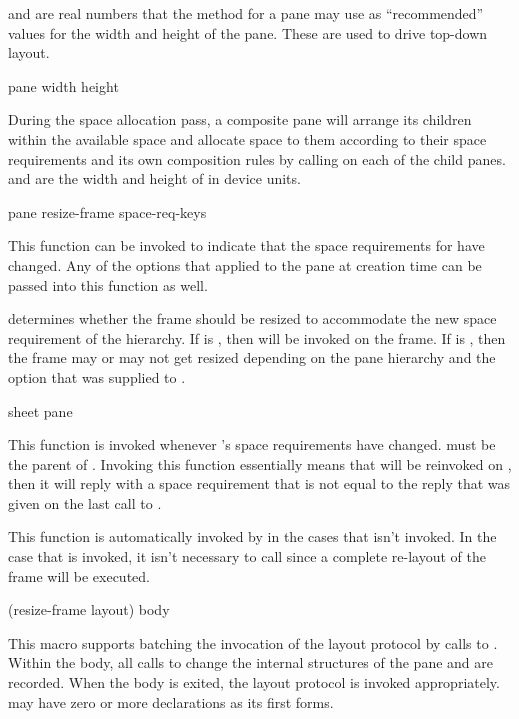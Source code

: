  and  are real numbers that the  method
for a pane may use as ``recommended'' values for the width and height of the
pane.  These are used to drive top-down layout.

 {pane width height}

During the space allocation pass, a composite pane will arrange its children
within the available space and allocate space to them according to their space
requirements and its own composition rules by calling  on
each of the child panes.   and  are the width and height
of  in device units.


 {pane \key resize-frame \rest space-req-keys} 

This function can be invoked to indicate that the space requirements for
 have changed.  Any of the options that applied to the pane at
creation time can be passed into this function as well.

 determines whether the frame should be resized to accommodate
the new space requirement of the hierarchy.  If  is
, then  will be invoked on the frame.  If
 is , then the frame may or may not get resized
depending on the pane hierarchy and the  option that was
supplied to .

 {sheet pane}

This function is invoked whenever 's space requirements have changed.
 must be the parent of .  Invoking this function
essentially means that  will be reinvoked on , then
it will reply with a space requirement that is not equal to the reply that was
given on the last call to .

This function is automatically invoked by  in the
cases that  isn't invoked.  In the case that 
is invoked, it isn't necessary to call 
since a complete re-layout of the frame will be executed.

 {(\key resize-frame layout) \body body}

This macro supports batching the invocation of the layout protocol by calls
to .  Within the body, all calls to
 change the internal structures of the pane and
are recorded.  When the body is exited, the layout protocol is invoked
appropriately.   may have zero or more declarations as its first
forms.


